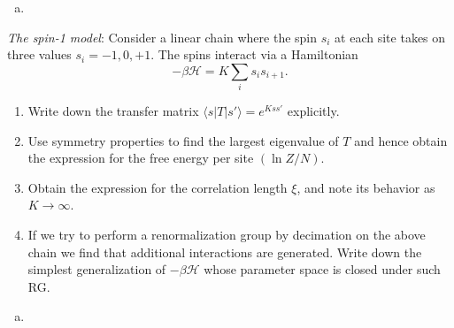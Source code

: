 \begin{solution}
    \begin{enumerate}[(a)]
        \item
    \end{enumerate}
\end{solution}

\begin{problem}
    \textit{The spin-1 model}: Consider a linear chain where the spin $s_i$ at each site takes on three values $s_i = -1, 0, +1$. The spins interact via a Hamiltonian
    \[
        -\beta\mathcal{H} = K\sum_i s_i s_{i+1}.
    \]

    \begin{enumerate}
        \item[(a)] Write down the transfer matrix $\langle s|T|s'\rangle = e^{Kss'}$ explicitly.

        \item[(b)] Use symmetry properties to find the largest eigenvalue of $T$ and hence obtain the expression for the free energy per site $(\ln Z/N)$.

        \item[(c)] Obtain the expression for the correlation length $\xi$, and note its behavior as $K \to \infty$.

        \item[(d)] If we try to perform a renormalization group by decimation on the above chain we find that additional interactions are generated. Write down the simplest generalization of $-\beta\mathcal{H}$ whose parameter space is closed under such RG.
    \end{enumerate}
\end{problem}

\begin{solution}
    \begin{enumerate}[(a)]
        \item
    \end{enumerate}
\end{solution}

